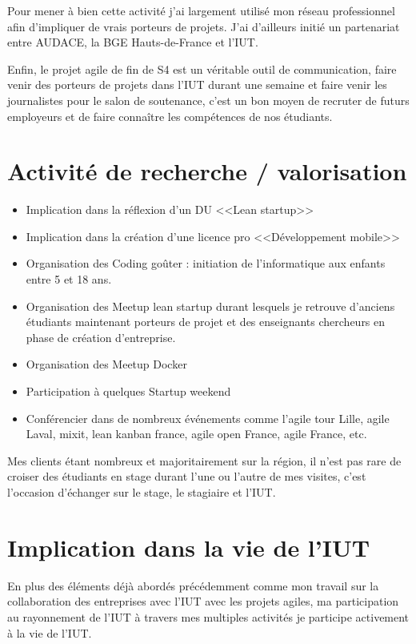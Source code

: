 \documentclass[a4paper]{article}
\begin{document}
Pour mener à bien cette activité j'ai largement utilisé mon réseau professionnel afin d'impliquer de vrais porteurs de projets. 
J'ai d'ailleurs initié un partenariat entre AUDACE, la BGE Hauts-de-France et l'IUT.

Enfin, le projet agile de fin de S4 est un véritable outil de communication, faire venir des porteurs de projets dans l'IUT durant une semaine et faire venir les journalistes pour le salon de soutenance, c'est un bon moyen de recruter de futurs employeurs et de faire connaître les compétences de nos étudiants.

\section{Activité de recherche / valorisation}

\begin{itemize}
  \item Implication dans la réflexion d'un DU <<Lean startup>>
  \item Implication dans la création d'une licence pro <<Développement mobile>> 
  \item Organisation des Coding goûter : initiation de l'informatique aux enfants entre 5 et 18 ans.
  \item Organisation des Meetup lean startup durant lesquels je retrouve d'anciens étudiants maintenant porteurs de projet et des enseignants chercheurs en phase de création d'entreprise.
  \item Organisation des Meetup Docker
  \item Participation à quelques Startup weekend
  \item Conférencier dans de nombreux événements comme l'agile tour Lille, agile Laval, mixit, lean kanban france, agile open France, agile France, etc.
\end{itemize}

Mes clients étant nombreux et majoritairement sur la région, il n'est pas rare de croiser des étudiants en stage durant l'une ou l'autre de mes visites, c'est l'occasion d'échanger sur le stage, le stagiaire et l'IUT.

\section{Implication dans la vie de l'IUT}

En plus des éléments déjà abordés précédemment comme mon travail sur la collaboration des entreprises avec l'IUT avec les projets agiles, ma participation au rayonnement de l'IUT à travers mes multiples activités je participe activement à la vie de l'IUT.
\end{document}
